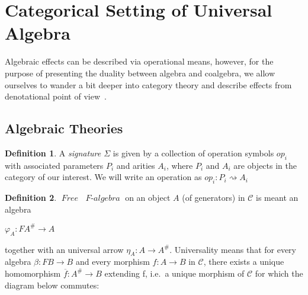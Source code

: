 \documentclass[declaration,shortabstract]{iithesis}
\theoremstyle{definition} \newtheorem{definition}{Definition}[chapter]
\theoremstyle{remark} \newtheorem{remark}[definition]{Observation}
\theoremstyle{plain} \newtheorem{theorem}[definition]{Theorem}
\theoremstyle{plain} \newtheorem{lemma}[definition]{Lemma}
\newcommand{\mathVar}[1]{{\operatorname{\mathit{#1}}}}
\begin{document}
\section{Categorical Setting of Universal Algebra}

Algebraic effects can be described via operational means, however,
for the purpose of presenting the duality between algebra and coalgebra,
we allow ourselves to wander a bit deeper into category theory and describe
effects from denotational point of view~\cite{bauer-what-is-algebraic}.

    \subsection{Algebraic Theories}

    \begin{definition}

    A \textit{signature $ \Sigma $} is given by a collection of operation
    symbols $ op_{i} $ with associated parameters $ P_{i} $ and arities $ A_{i} $,
    where $ P_{i} $ and $ A_{i} $ are objects in the category of our interest.
    We will write an operation as $ op_{i} : P_{i} \rightsquigarrow A_{i} $

    \end{definition}

    \begin{definition}

    $\mathVar{Free}$ $\mathVar{F-algebra}$ on an object $A$ (of generators) in $\mathcal{C}$ is meant an algebra

    \begin{center}

    $ \varphi_{A} : F A^{\#} \longrightarrow A $

    \end{center}

    \noindent
    together with an universal arrow $ \eta_{A} : A \longrightarrow A^{\#} $.
    Universality means that for every algebra $ \beta : F B \longrightarrow B $
    and every morphism $ f : A \longrightarrow B $ in $ \mathcal{C}$, there
    exists a unique homomorphism $ \overline{f} : A^{\#} \longrightarrow B $
    extending f, i.e.\ a unique morphism of $ \mathcal{C}$ for which the diagram
    below commutes:

    \begin{center}
    \end{center}

    \end{definition}
\end{document}
